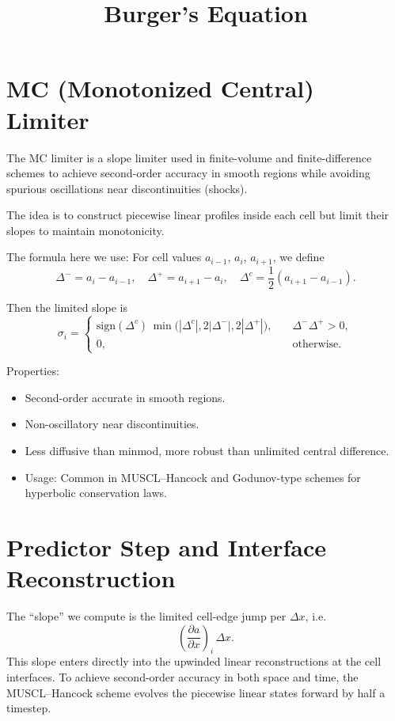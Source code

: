 \documentclass{article}
\title{Burger's Equation}
\begin{document}
\maketitle
\section{MC (Monotonized Central) Limiter}
The MC limiter is a slope limiter used in finite-volume and finite-difference schemes to achieve second-order accuracy in smooth regions while avoiding spurious oscillations near discontinuities (shocks).

The idea is to construct piecewise linear profiles inside each cell but limit their slopes to maintain monotonicity.

The formula here we use: For cell values $a_{i-1}$, $a_i$, $a_{i+1}$, we define
\begin{equation}
\Delta^- = a_i - a_{i-1}, \quad
\Delta^+ = a_{i+1} - a_i, \quad
\Delta^c = \frac{1}{2}(a_{i+1} - a_{i-1}).
\end{equation}

Then the limited slope is
\begin{equation}
\sigma_i =
\begin{cases}
\text{sign}(\Delta^c) \, \min\!\Big( |\Delta^c|, 2|\Delta^-|, 2|\Delta^+| \Big), &\quad \Delta^- \Delta^+ > 0, \\
0, &\quad \text{otherwise}.
\end{cases}	
\end{equation}

Properties:
\begin{itemize}
	\item Second-order accurate in smooth regions.
	\item Non-oscillatory near discontinuities.
	\item Less diffusive than minmod, more robust than unlimited central difference.
	\item Usage: Common in MUSCL--Hancock and Godunov-type schemes for hyperbolic conservation laws.
\end{itemize}

\section{Predictor Step and Interface Reconstruction}
The ``slope'' we compute is the limited cell-edge jump per $\Delta x$, i.e.
\begin{equation}
	\left(\frac{\partial a}{\partial x}\right)_i \, \Delta x.
\end{equation}
This slope enters directly into the upwinded linear reconstructions at the cell interfaces. To achieve second-order accuracy in both space and time, the MUSCL--Hancock scheme evolves the piecewise linear states forward by half a timestep. 
\end{document}
